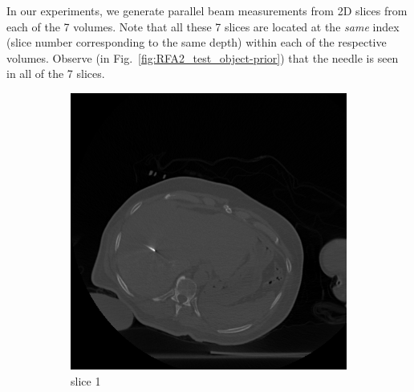 \documentclass[journal]{IEEEtran}
\begin{document}
In our experiments, we generate parallel beam measurements from 2D
slices from each of the 7 volumes. Note that all these 7 slices are
located at the \emph{same} index (slice number corresponding to the
same depth) within each of the respective volumes.  Observe (in
Fig.~\ref{fig:RFA2_test_object-prior}) that the needle is seen in all
of the 7 slices.
\begin{figure}[h!]
    \begin{subfigure}[b]{0.24\linewidth}
        \includegraphics[width=\textwidth]{../images/tmh/RFA2/template1.png}
 \caption{slice 1}
    \end{subfigure}
    \begin{subfigure}[b]{0.24\linewidth}

\end{subfigure}
\end{figure}
\end{document}

